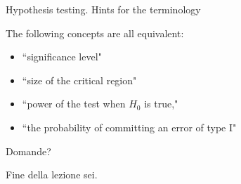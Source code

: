 \documentclass{beamer}
\begin{document}

\begin{frame}
{\small \centerline{Hypothesis testing. Hints for the terminology}}

The following concepts are all equivalent:
\begin{itemize}
\item ``significance level" 
\item ``size of the critical region"
\item ``power of the test when $H_0$  is true,"
\item ``the probability of committing an error of type I"
\end{itemize}

\end{frame}



\begin{frame}
{\centerline{Domande?}}
\vspace{1cm}
\begin{center}
    \LARGE{Fine della lezione sei.}
\end{center}

\end{frame}
\end{document}
